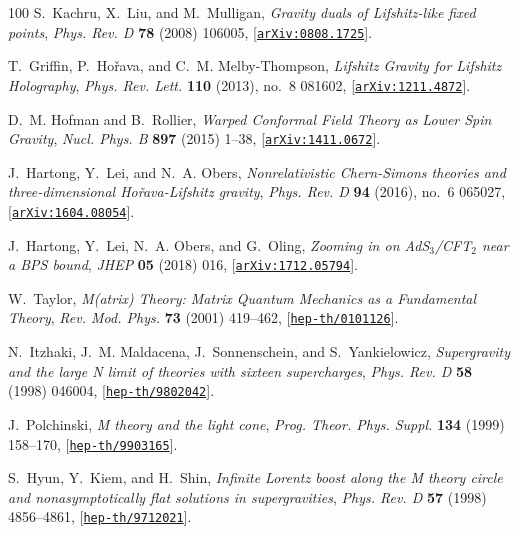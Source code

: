 \documentclass[11pt]{article}
\begin{document}
\begin{thebibliography}{100}
S.~Kachru, X.~Liu, and M.~Mulligan, {\it {Gravity duals of Lifshitz-like fixed
  points}},  {\em Phys. Rev. D} {\bf 78} (2008) 106005,
  [\href{http://arxiv.org/abs/0808.1725}{{\tt arXiv:0808.1725}}].

T.~Griffin, P.~Ho\v{r}ava, and C.~M. Melby-Thompson, {\it {Lifshitz Gravity for
  Lifshitz Holography}},  {\em Phys. Rev. Lett.} {\bf 110} (2013), no.~8
  081602, [\href{http://arxiv.org/abs/1211.4872}{{\tt arXiv:1211.4872}}].

D.~M. Hofman and B.~Rollier, {\it {Warped Conformal Field Theory as Lower Spin
  Gravity}},  {\em Nucl. Phys. B} {\bf 897} (2015) 1--38,
  [\href{http://arxiv.org/abs/1411.0672}{{\tt arXiv:1411.0672}}].

J.~Hartong, Y.~Lei, and N.~A. Obers, {\it {Nonrelativistic Chern-Simons
  theories and three-dimensional Ho\v{r}ava-Lifshitz gravity}},  {\em Phys.
  Rev. D} {\bf 94} (2016), no.~6 065027,
  [\href{http://arxiv.org/abs/1604.08054}{{\tt arXiv:1604.08054}}].

J.~Hartong, Y.~Lei, N.~A. Obers, and G.~Oling, {\it {Zooming in on
  AdS$_{3}$/CFT$_{2}$ near a BPS bound}},  {\em JHEP} {\bf 05} (2018) 016,
  [\href{http://arxiv.org/abs/1712.05794}{{\tt arXiv:1712.05794}}].

W.~Taylor, {\it {M(atrix) Theory: Matrix Quantum Mechanics as a Fundamental
  Theory}},  {\em Rev. Mod. Phys.} {\bf 73} (2001) 419--462,
  [\href{http://arxiv.org/abs/hep-th/0101126}{{\tt hep-th/0101126}}].

N.~Itzhaki, J.~M. Maldacena, J.~Sonnenschein, and S.~Yankielowicz, {\it
  {Supergravity and the large N limit of theories with sixteen supercharges}},
  {\em Phys. Rev. D} {\bf 58} (1998) 046004,
  [\href{http://arxiv.org/abs/hep-th/9802042}{{\tt hep-th/9802042}}].

J.~Polchinski, {\it {M theory and the light cone}},  {\em Prog. Theor. Phys.
  Suppl.} {\bf 134} (1999) 158--170,
  [\href{http://arxiv.org/abs/hep-th/9903165}{{\tt hep-th/9903165}}].

S.~Hyun, Y.~Kiem, and H.~Shin, {\it {Infinite Lorentz boost along the M theory
  circle and nonasymptotically flat solutions in supergravities}},  {\em Phys.
  Rev. D} {\bf 57} (1998) 4856--4861,
  [\href{http://arxiv.org/abs/hep-th/9712021}{{\tt hep-th/9712021}}].


\end{thebibliography}
\end{document}
